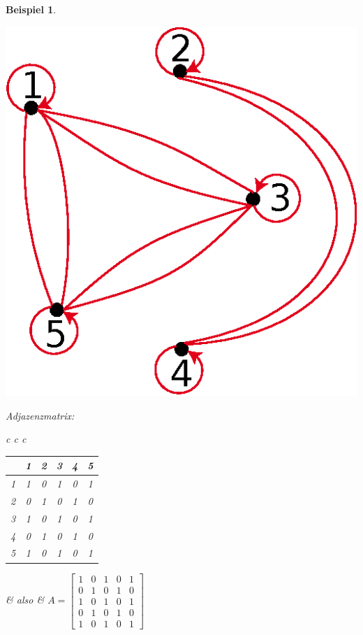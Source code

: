 \documentclass{report}
\newtheorem{myexample}{Beispiel}
\begin{document}
\begin{myexample}
\begin{center}\includegraphics[scale=0.25]{img/3_1-r-as-graph.eps}\end{center}
Adjazenzmatrix:
\begin{center}
\begin{tabular}{c c c}
\begin{tabular}{c | c | c | c | c | c |}
& 1 & 2 & 3 & 4 & 5\\ \hline
1 & 1 & 0 & 1 & 0 & 1\\ \hline
2 & 0 & 1 & 0 & 1 & 0\\ \hline
3 & 1 & 0 & 1 & 0 & 1\\ \hline
4 & 0 & 1 & 0 & 1 & 0\\ \hline
5 & 1 & 0 & 1 & 0 & 1\\ \hline\end{tabular} & also &
$A = \left[\begin{array}{rrrrr}
1 & 0 & 1 & 0 & 1 \\
0 & 1 & 0 & 1 & 0\\
1 & 0 & 1 & 0 & 1\\
0 & 1 & 0 & 1 & 0\\
1 & 0 & 1 & 0 & 1\end{array}\right]$
\end{tabular}
\end{center}
\end{myexample}
\newpage
\end{document}
